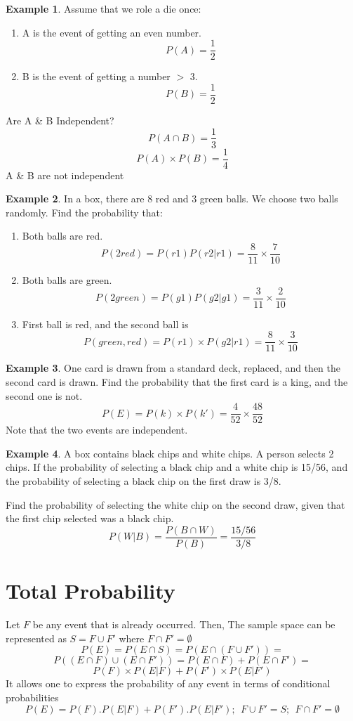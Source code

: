 \documentclass[12pt]{article}
\theoremstyle{definition}
\newtheorem{exmp}{Example}[section]
\begin{document}
\begin{exmp}
Assume that we role a die once:
\begin{enumerate}
    \item A is the event of getting an even number.
        $$ P(A) = \frac{1}{2} $$
    \item B is the event of getting a number $>$ 3.
        $$ P(B) = \frac{1}{2} $$
\end{enumerate}    
Are A \& B Independent?
$$ P(A\cap B) = \frac{1}{3} $$
$$ P(A)\times P(B) = \frac{1}{4} $$
A \& B are not independent
\end{exmp}    
\begin{exmp}
In a box, there are 8 red and 3 green
balls. We choose two balls randomly.
Find the probability that:
\begin{enumerate}
    \item Both balls are red.
        $$ P(2red)= P(r1)P(r2|r1) = \frac{8}{11} \times \frac{7}{10} $$
    \item Both balls are green.
        $$ P(2green) = P(g1)P(g2|g1) = \frac{3}{11} \times \frac{2}{10}$$
    \item First ball is red, and the second ball is
        $$ P(green,red) =  P(r1) \times P(g2|r1) 
        = \frac{8}{11} \times \frac{3}{10}
        $$
\end{enumerate}
\end{exmp}    
\begin{exmp}
     One card is drawn from a standard deck, replaced, and then the second card
     is drawn.  Find the probability that the first card is a king, and the
     second one is not.
 $$ P(E) = P(k) \times P(k') = \frac{4}{52} \times \frac{48}{52} $$
 Note that the two events are independent.
\end{exmp}
\begin{exmp}
     A box contains black chips and white chips. A person selects 2 chips. If
     the probability of selecting a black chip and a white chip is 15/56, and
     the probability of selecting a black chip on the first draw is 3/8.  
     
     Find the probability of selecting the white chip on the second draw, given that
     the first chip selected was a black chip.
     $$ P(W|B) = \frac{P(B \cap W)}{P(B)} = \frac{15/56}{3/8} $$
\end{exmp}

\section{Total Probability}
Let $F$ be any event that is already occurred. Then, The sample space can be
represented as $S = F \cup F'$ where $ F \cap F' = \emptyset $
$$ P(E) = P(E \cap S) = P(E \cap (F \cup F')) = $$
$$ P((E \cap F) \cup (E \cap F') ) = P(E\cap F)  + P(E \cap F') =$$
$$ P(F) \times P(E|F) + P(F') \times P(E|F')$$
It allows one to express the probability of any event in terms 
of conditional probabilities
$$ P(E) = P(F).P(E|F) + P(F').P(E|F'); \ \ F \cup F' = S; \ \ F \cap F' = \emptyset $$
\end{document}
